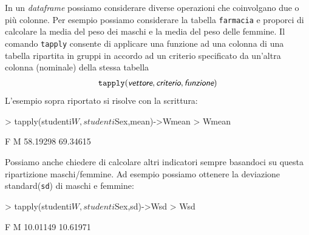 \documentclass[onecolumn,11pt]{book}
\newcommand{\varia}[1]{\textsl{\textsf{#1}}}
\begin{document}
In un \emph{dataframe} possiamo considerare diverse operazioni che coinvolgano due o pi\`u colonne. Per esempio possiamo considerare la tabella \texttt{farmacia} e proporci di calcolare la media del peso dei maschi e la media del peso delle femmine. Il comando \texttt{tapply}  consente di applicare una funzione ad una colonna di una tabella ripartita in gruppi in accordo ad un criterio specificato da un'altra colonna (nominale) della stessa tabella 
\begin{eqnarray*}
\texttt{tapply}(\varia{vettore},\varia{criterio} ,\varia{funzione})\end{eqnarray*}
L'esempio sopra riportato si risolve con la scrittura:
\begin{Schunk}
\begin{Sinput}
> tapply(studenti$W, studenti$Sex,mean)->Wmean
> Wmean
\end{Sinput}
\begin{Soutput}
       F        M 
58.19298 69.34615 
\end{Soutput}
\end{Schunk}
Possiamo anche chiedere di calcolare altri indicatori sempre basandoci  su questa ripartizione maschi/femmine.
Ad esempio possiamo ottenere la deviazione standard(\texttt{sd}) di maschi e femmine:
\begin{Schunk}
\begin{Sinput}
> tapply(studenti$W, studenti$Sex,sd)->Wsd
> Wsd
\end{Sinput}
\begin{Soutput}
       F        M 
10.01149 10.61971 
\end{Soutput}
\end{Schunk}
\end{document}
